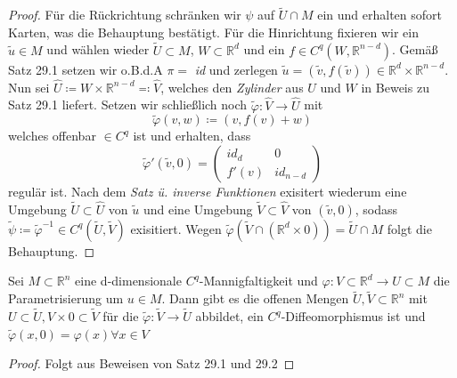\begin{proof}
Für die Rückrichtung schränken wir $\psi $ auf $\tilde{U} \cap M $ ein und erhalten sofort Karten, was die Behauptung bestätigt. Für die Hinrichtung fixieren wir ein $\tilde{u} \in M $ und wählen wieder $\tilde{U} \subset M $, $W \subset \mathbb{R}^d $ und ein $f \in C^q \left( W, \mathbb{R}^{n-d} \right)$. Gemäß Satz 29.1 setzen wir o.B.d.A $\pi = $ \textit{id} und zerlegen $\tilde{u} = \left( \tilde{v}, f \left( \tilde{v} \right) \right) \in \mathbb{R}^d \times \mathbb{R}^{n-d}$. Nun sei $\hat{U} \coloneqq W \times \mathbb{R}^{n-d} \eqqcolon \hat{V} $, welches den \emph{Zylinder} aus $U$ und $W$ in Beweis zu Satz 29.1 liefert.
Setzen wir schließlich noch $\tilde{\varphi}: \hat{V} \rightarrow \hat{U} $ mit
\begin{equation*}
\tilde{\varphi} (v,w) \coloneqq (v, f(v) + w)
\end{equation*}
welches offenbar $\in C^q$ ist und erhalten, dass
\begin{equation*}
\tilde{\varphi}' \left( \tilde{v}, 0 \right) =
    \begin{pmatrix}
    \textit{id}_d & 0 \\
    f'(v)         & \textit{id}_{n-d}
    \end{pmatrix}
\end{equation*}
regulär ist. Nach dem \emph{Satz ü. inverse Funktionen} exisitert wiederum eine Umgebung $ \tilde{U} \subset \hat{U}$ von $\tilde{u}$ und eine Umgebung $ \tilde{V} \subset \hat{V} $ von $ \left( \tilde{v}, 0 \right) $, sodass $\tilde{\psi} \coloneqq \tilde{\varphi}^{-1} \in C^q \left( \tilde{U}, \tilde{V} \right) $
exisitiert. Wegen $\tilde{\varphi} \left( \tilde{V} \cap \left( \mathbb{R}^d \times {0} \right) \right)
= \tilde{U} \cap M $ folgt die Behauptung.
\end{proof}

\begin{folgerung}
Sei $M \subset \mathbb{R}^n$ eine d-dimensionale $C^q$-Mannigfaltigkeit und $\varphi: V \subset \mathbb{R}^d \rightarrow U \subset M $ die Parametrisierung um $u \in M $. Dann gibt es die offenen Mengen $\tilde{U}, \tilde{V} \subset \mathbb{R}^n $ mit $ U \subset \tilde{U}, V \times {0} \subset \tilde{V} $ für die $\tilde{\varphi} : \tilde{V} \rightarrow \tilde{U} $ abbildet, ein $C^q$-Diffeomorphismus ist und $\tilde{\varphi} (x, 0) = \varphi (x) \forall x \in V $
\end{folgerung}

\begin{proof}
Folgt aus Beweisen von Satz 29.1 und 29.2
\end{proof}

